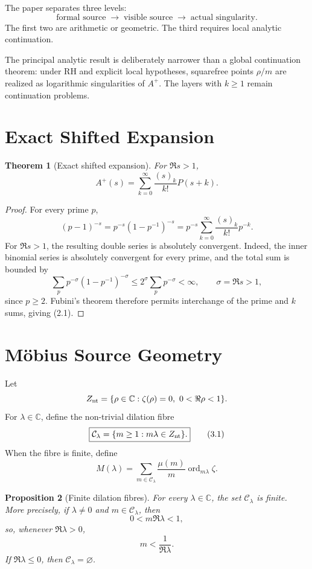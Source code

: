 \documentclass[11pt,a4paper]{article}
\newtheorem{theorem}{Theorem}[section]
\newtheorem{proposition}[theorem]{Proposition}
\theoremstyle{remark}
\newcommand{\C}{\mathbb C}
\newcommand{\ord}{\operatorname{ord}}
\begin{document}
The paper separates three levels:
\[
\boxed{\text{formal source}\;\longrightarrow\;\text{visible source}\;\longrightarrow\;\text{actual singularity}.}
\]
The first two are arithmetic or geometric. The third requires local analytic continuation.

The principal analytic result is deliberately narrower than a global continuation theorem: under RH and explicit local hypotheses, squarefree points $\rho/m$ are realized as logarithmic singularities of $A^+$. The layers with $k\ge1$ remain continuation problems.

\section{Exact Shifted Expansion}

\begin{theorem}[Exact shifted expansion]
For $\Re s>1$,
\[
\boxed{A^+(s)=\sum_{k=0}^{\infty}\frac{(s)_k}{k!}P(s+k).}
\tag{2.1}
\]
\end{theorem}

\begin{proof}
For every prime $p$,
\[
(p-1)^{-s}=p^{-s}(1-p^{-1})^{-s}
=p^{-s}\sum_{k=0}^{\infty}\frac{(s)_k}{k!}p^{-k}.
\]
For $\Re s>1$, the resulting double series is absolutely convergent. Indeed, the inner binomial series is absolutely convergent for every prime, and the total sum is bounded by
\[
\sum_p p^{-\sigma}(1-p^{-1})^{-\sigma}
\le 2^\sigma\sum_p p^{-\sigma}<\infty,
\qquad \sigma=\Re s>1,
\]
since $p\ge2$. Fubini's theorem therefore permits interchange of the prime and $k$ sums, giving (2.1).
\end{proof}

\section{Möbius Source Geometry}

Let
\[
Z_{\rm nt}=\{\rho\in\C:\zeta(\rho)=0,\ 0<\Re\rho<1\}.
\]
For $\lambda\in\C$, define the non-trivial dilation fibre
\[
\boxed{\mathcal C_\lambda=\{m\ge1:m\lambda\in Z_{\rm nt}\}.}
\tag{3.1}
\]
When the fibre is finite, define
\[
\boxed{M(\lambda)=\sum_{m\in\mathcal C_\lambda}\frac{\mu(m)}m\ord_{m\lambda}\zeta.}
\tag{3.2}
\]

\begin{proposition}[Finite dilation fibres]
For every $\lambda\in\C$, the set $\mathcal C_\lambda$ is finite. More precisely, if $\lambda\ne0$ and $m\in\mathcal C_\lambda$, then
\[
0<m\Re\lambda<1,
\]
so, whenever $\Re\lambda>0$,
\[
m<\frac1{\Re\lambda}.
\]
If $\Re\lambda\le0$, then $\mathcal C_\lambda=\varnothing$.
\end{proposition}
\end{document}
